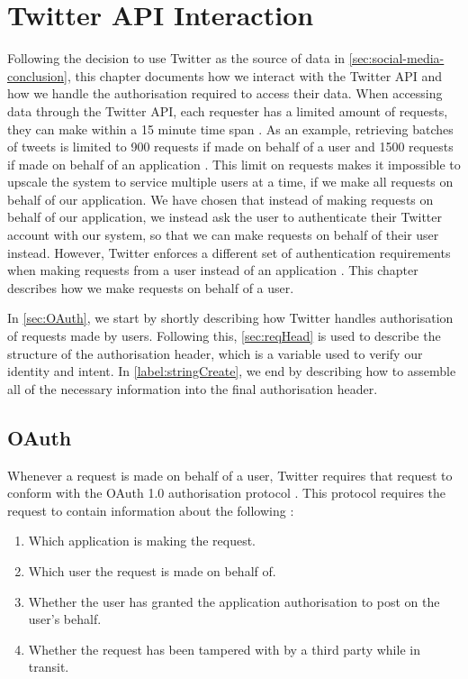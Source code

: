 \chapter{Twitter API Interaction}\label{cha:twitterAPI}
Following the decision to use Twitter as the source of data in
\autoref{sec:social-media-conclusion}, this chapter documents how we interact
with the Twitter API and how we handle the authorisation required to access
their data. When accessing data through the Twitter API, each requester has a
limited amount of requests, they can make within a 15 minute time span
\citep{twitterRateLimit}. As an example, retrieving batches of tweets is
limited to 900 requests if made on behalf of a user and 1500 requests if made on
behalf of an application \citep{twitterTimelineRateLimit}. This limit on
requests makes it impossible to upscale the system to service multiple users at
a time, if we make all requests on behalf of our application. We have chosen
that instead of making requests on behalf of our application, we instead ask the
user to authenticate their Twitter account with our system, so that we can make
requests on behalf of their user instead. However, Twitter enforces a different
set of authentication requirements when making requests from a user instead of
an application \citep{TwitterAPIAuth}. This chapter describes how we make
requests on behalf of a user.\nl

In \autoref{sec:OAuth}, we start by shortly describing how Twitter handles
authorisation of requests made by users. Following this, \autoref{sec:reqHead}
is used to describe the structure of the authorisation header, which is a
variable used to verify our identity and intent.
In \autoref{label:stringCreate}, we end by describing how to assemble all of the
necessary information into the final authorisation header.

\section{OAuth}\label{sec:OAuth}
Whenever a request is made on behalf of a user, Twitter requires that request to
conform with the OAuth 1.0 authorisation protocol \citep{OAuth1}. This protocol
requires the request to contain information about the following
\citep{TwitterAPIAuth}:

\begin{enumerate}
 	\item Which application is making the request.
	\item Which user the request is made on behalf of.
	\item Whether the user has granted the application authorisation to post on the
user’s behalf.
	\item Whether the request has been tampered with by a third party while in
	transit.
\end{enumerate}

